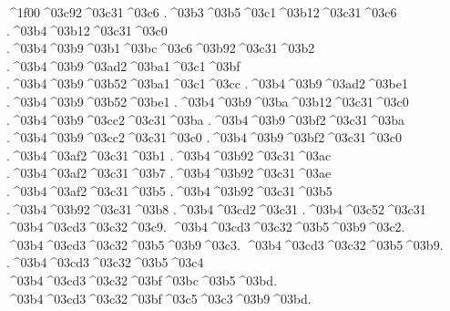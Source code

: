 {^^^^1f00^^^^03c92^^^^03c31^^^^03c6    		%
.^^^^03b3^^^^03b5^^^^03c1^^^^03b12^^^^03c31^^^^03c6  		%
.^^^^03b4^^^^03b12^^^^03c31^^^^03c0    		%
.^^^^03b4^^^^03b9^^^^03b1^^^^03bc^^^^03c6^^^^03b92^^^^03c31^^^^03b2 		%
.^^^^03b4^^^^03b9^^^^03ad2^^^^03ba1^^^^03c1^^^^03bf 		%
.^^^^03b4^^^^03b9^^^^03b52^^^^03ba1^^^^03c1^^^^03cc
.^^^^03b4^^^^03b9^^^^03ad2^^^^03be1   		%
.^^^^03b4^^^^03b9^^^^03b52^^^^03be1    		%
.^^^^03b4^^^^03b9^^^^03ba^^^^03b12^^^^03c31^^^^03c0  		%
.^^^^03b4^^^^03b9^^^^03cc2^^^^03c31^^^^03ba  		%
.^^^^03b4^^^^03b9^^^^03bf2^^^^03c31^^^^03ba
.^^^^03b4^^^^03b9^^^^03cc2^^^^03c31^^^^03c0		%
.^^^^03b4^^^^03b9^^^^03bf2^^^^03c31^^^^03c0
.^^^^03b4^^^^03af2^^^^03c31^^^^03b1       		%
.^^^^03b4^^^^03b92^^^^03c31^^^^03ac
.^^^^03b4^^^^03af2^^^^03c31^^^^03b7   		%
.^^^^03b4^^^^03b92^^^^03c31^^^^03ae
.^^^^03b4^^^^03af2^^^^03c31^^^^03b5   		%
.^^^^03b4^^^^03b92^^^^03c31^^^^03b5
.^^^^03b4^^^^03b92^^^^03c31^^^^03b8    		%
.^^^^03b4^^^^03cd2^^^^03c31    		%
.^^^^03b4^^^^03c52^^^^03c31
%
	^^^^03b4^^^^03cd3^^^^03c32^^^^03c9.  		%
	^^^^03b4^^^^03cd3^^^^03c32^^^^03b5^^^^03b9^^^^03c2.
	^^^^03b4^^^^03cd3^^^^03c32^^^^03b5^^^^03b9^^^^03c3.
	^^^^03b4^^^^03cd3^^^^03c32^^^^03b5^^^^03b9.
	.^^^^03b4^^^^03cd3^^^^03c32^^^^03b5^^^^03c4
	^^^^03b4^^^^03cd3^^^^03c32^^^^03bf^^^^03bc^^^^03b5^^^^03bd.
	^^^^03b4^^^^03cd3^^^^03c32^^^^03bf^^^^03c5^^^^03c3^^^^03b9^^^^03bd.
}
